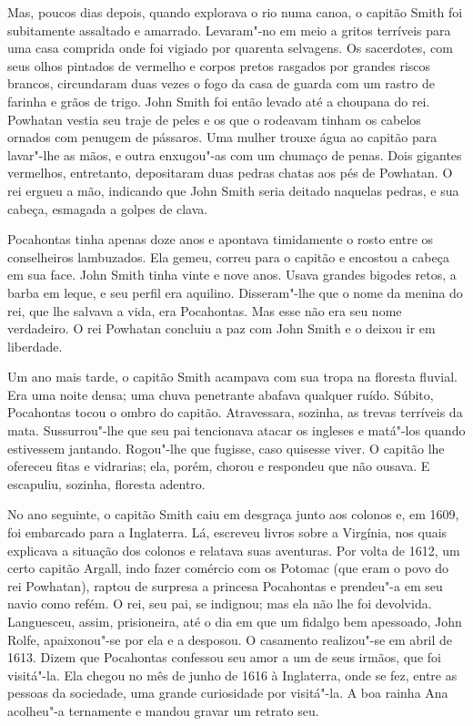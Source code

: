 Mas, poucos dias depois, quando explorava o rio numa canoa, o capitão Smith
foi subitamente assaltado e amarrado. Levaram"-no em meio a gritos
terríveis para uma casa comprida onde foi vigiado por quarenta selvagens.
Os sacerdotes, com seus olhos pintados de vermelho e corpos pretos
rasgados por grandes riscos brancos, circundaram duas vezes o fogo da casa
de guarda com um rastro de farinha e grãos de trigo. John Smith foi então
levado até a choupana do rei. Powhatan vestia seu traje de peles e os que
o rodeavam tinham os cabelos ornados com penugem de pássaros. Uma mulher
trouxe água ao capitão para lavar"-lhe as mãos, e outra enxugou"-as com um
chumaço de penas. Dois gigantes vermelhos, entretanto, depositaram duas
pedras chatas aos pés de Powhatan. O rei ergueu a mão, indicando que John
Smith seria deitado naquelas pedras, e sua cabeça, esmagada a golpes de
clava.

Pocahontas tinha apenas doze anos e apontava timidamente o rosto entre os
conselheiros lambuzados. Ela gemeu, correu para o capitão e encostou a
cabeça em sua face. John Smith tinha vinte e nove anos. Usava grandes
bigodes retos, a barba em leque, e seu perfil era aquilino. Disseram"-lhe
que o nome da menina do rei, que lhe salvava a vida, era Pocahontas. Mas
esse não era seu nome verdadeiro. O rei Powhatan concluiu a paz com John
Smith e o deixou ir em liberdade.

Um ano mais tarde, o capitão Smith acampava com sua tropa na floresta
fluvial. Era uma noite densa; uma chuva penetrante abafava qualquer ruído.
Súbito, Pocahontas tocou o ombro do capitão. Atravessara, sozinha, as
trevas terríveis da mata. Sussurrou"-lhe que seu pai tencionava atacar os
ingleses e matá"-los quando estivessem jantando. Rogou"-lhe que fugisse,
caso quisesse viver. O capitão lhe ofereceu fitas e vidrarias; ela, porém,
chorou e respondeu que não ousava. E escapuliu, sozinha, floresta adentro.

No ano seguinte, o capitão Smith caiu em desgraça junto aos colonos e, em
1609, foi embarcado para a Inglaterra. Lá, escreveu livros sobre a
Virgínia, nos quais explicava a situação dos colonos e relatava suas
aventuras. Por volta de 1612, um certo capitão Argall, indo fazer comércio
com os Potomac (que eram o povo do rei Powhatan), raptou de surpresa a
princesa Pocahontas e prendeu"-a em seu navio como refém. O rei, seu pai,
se indignou; mas ela não lhe foi devolvida. Languesceu, assim,
prisioneira, até o dia em que um fidalgo bem apessoado, John Rolfe,
apaixonou"-se por ela e a desposou. O casamento realizou"-se em abril de
1613. Dizem que Pocahontas confessou seu amor a um de seus irmãos, que foi
visitá"-la. Ela chegou no mês de junho de 1616 à Inglaterra, onde se fez,
entre as pessoas da sociedade, uma grande curiosidade por visitá"-la. A boa
rainha Ana acolheu"-a ternamente e mandou gravar um retrato seu.

